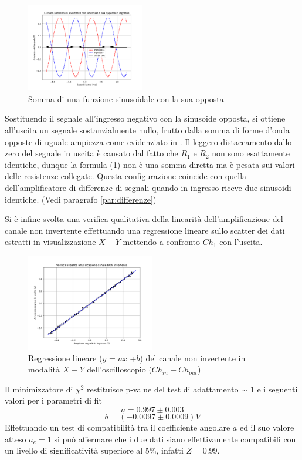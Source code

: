 \documentclass[journal]{IEEEtran}
\begin{document}
\begin{figure}[H]%
\begin{center}
\includegraphics[width=0.46\textwidth]{analysis/output/OPA_mixer_sin2.pdf}
\caption{Somma di una funzione sinusoidale con la sua opposta}
\label{fig:Mixer2}
\end{center}
\end{figure}

Sostituendo il segnale all'ingresso negativo con la sinusoide opposta, si ottiene all'uscita un segnale sostanzialmente nullo, frutto dalla somma di forme d'onda opposte di uguale ampiezza come evidenziato in . Il leggero distaccamento dallo zero del segnale in uscita è causato dal fatto che $R_1$ e $R_2$ non sono esattamente identiche, dunque la formula (1) non è una somma diretta ma è pesata sui valori delle resistenze collegate. Questa configurazione coincide con quella dell'amplificatore di differenze di segnali quando in ingresso riceve due sinusoidi identiche. (Vedi paragrafo \ref{par:differenze})

 Si è infine svolta una verifica qualitativa della linearità dell'amplificazione del canale non invertente effettuando una regressione lineare sullo scatter dei dati estratti in visualizzazione $X-Y$ mettendo a confronto $Ch_1$ con l'uscita.
\begin{figure}[H]%
\begin{center}
\includegraphics[width=0.50\textwidth]{analysis/output/OPA-linfit-non-inv.pdf}
\caption{Regressione lineare ($y$ = $ax$ +$b$) del canale non invertente in modalità $X-Y$ dell'oscilloscopio ($Ch_{in}-Ch_{out}$)}
\label{fig:lin-non-inv}
\end{center}
\end{figure}
Il minimizzatore di $\chi^2$ restituisce p-value del test di adattamento $\sim$ 1 e i seguenti valori per i parametri di fit
\[a = 0.997 \pm 0.003 \]
\[b = (-0.0097 \pm 0.0009) V \]
Effettuando un test di compatibilità tra il coefficiente angolare $a$ ed il suo valore atteso $a_e = 1$ si può affermare che i due dati  siano effettivamente compatibili con un livello di significatività superiore al 5\%, infatti $Z=0.99$.
\end{document}
